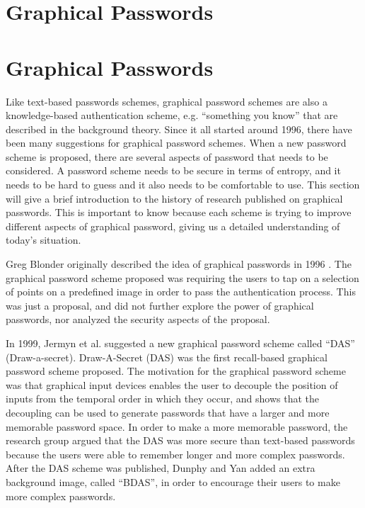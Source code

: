 \section{Graphical Passwords}
\label{chapter:literatureReview}
  

\section*{Graphical Passwords} \label{sec:literaturegraphicalPasswords}

  Like text-based passwords schemes, graphical password schemes are also a knowledge-based authentication scheme, e.g. ``something you know'' that are described in the background theory. Since it all started around 1996, there have been many suggestions for graphical password schemes. When a new password scheme is proposed, there are several aspects of password that needs to be considered. A password scheme needs to be secure in terms of entropy, and it needs to be hard to guess and it also needs to be comfortable to use. This section will give a brief introduction to the history of research published on graphical passwords. This is important to know because each scheme is trying to improve different aspects of graphical password, giving us a detailed understanding of today's situation.

  Greg Blonder originally described the idea of graphical passwords in 1996 \cite{Blonder}. The graphical password scheme proposed was requiring the users to tap on a selection of points on a predefined image in order to pass the authentication process. This was just a proposal, and did not further explore the power of graphical passwords, nor analyzed the security aspects of the proposal.

  In 1999, Jermyn et al. \cite{Jermyn} suggested a new graphical password scheme called ``DAS'' (Draw-a-secret). Draw-A-Secret (DAS) was the first recall-based graphical password scheme proposed. The motivation for the graphical password scheme was that graphical input devices enables the user to decouple the position of inputs from the temporal order in which they occur, and shows that the decoupling can be used to generate passwords that have a larger and more memorable password space. In order to make a more memorable password, the research group argued that the DAS was more secure than text-based passwords because the users were able to remember longer and more complex passwords. After the DAS scheme was published, Dunphy and Yan \cite{BDAS} added an extra background image, called ``BDAS'', in order to encourage their users to make more complex passwords. 

